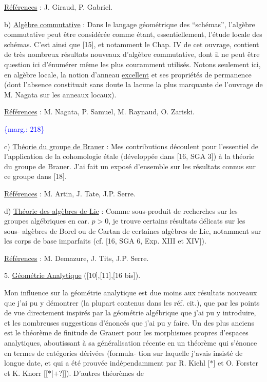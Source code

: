 \documentclass[11pt]{article}
\newcommand{\scanpage}[1]{\par\bigskip\noindent{\small\sffamily[scan #1]}\par}
\newcommand{\mspage}[1]{{\small\sffamily[p.\,#1]}}
\newcommand{\margin}[1]{\textcolor{blue}{\{\textsf{marg.:} #1\}}}
\newcommand{\uline}[1]{\underline{#1}}
\newcommand{\unsure}[1]{[#1?]}
\begin{document}
\uline{Références} : J. Giraud, P. Gabriel.

b) \uline{Algèbre commutative} : Dans le langage géométrique
des ``schémas'', l'algèbre commutative peut être considérée
comme étant, essentiellement, l'étude locale des schémas.
C'est ainsi que [15], et notamment le Chap. IV de cet
ouvrage, contient de très nombreux résultats nouveaux
d'algèbre commutative, dont il ne peut être question
ici d'énumérer même les plus couramment utilisés. Notons
seulement ici, en algèbre locale, la notion d'anneau
\uline{excellent} et ses propriétés de permanence (dont l'absence
constituait sans doute la lacune la plus marquante de
l'ouvrage de M. Nagata sur les anneaux locaux).

\uline{Références} : M. Nagata, P. Samuel, M. Raynaud, O. Zariski.

\margin{218}

\clearpage
\scanpage{119/219}
\mspage{. 6 .}

c) \uline{Théorie du groupe de Brauer} : Mes contributions
découlent pour l'essentiel de l'application de la
cohomologie étale (développée dans [16, SGA 3]) à la
théorie du groupe de Brauer. J'ai fait un exposé
d'ensemble sur les résultats connus sur ce groupe
dans [18].

\uline{Références} : M. Artin, J. Tate, J.P. Serre.

d) \uline{Théorie des algèbres de Lie} : Comme sous-produit
de recherches sur les groupes algébriques en car. $p > 0$,
je trouve certains résultats délicats sur les sous-%
algèbres de Borel ou de Cartan de certaines algèbres
de Lie, notamment sur les corps de base imparfaits
(cf. [16, SGA 6, Exp. XIII et XIV]).

\uline{Références} : M. Demazure, J. Tits, J.P. Serre.

5. \uline{Géométrie Analytique} ([10],[11],[16 bis]).

Mon influence sur la géométrie analytique
est due moins aux résultats nouveaux que j'ai pu y
démontrer (la plupart contenus dans les réf. cit.),
que par les points de vue directement inspirés par la
géométrie algébrique que j'ai pu y introduire, et les
nombreuses suggestions d'énoncés que j'ai pu y faire.
Un des plus anciens est le théorème de finitude de
Grauert pour les morphismes propres d'espaces analytiques,
aboutissant à sa généralisation récente en un théorème
qui s'énonce en termes de catégories dérivées (formula-%
tion sur laquelle j'avais insisté de longue date,
et qui a été prouvée indépendamment par R. Kiehl [$*$]
et O. Forster et K. Knorr [\unsure{$*$|$+$}]). D'autres théorèmes de
\end{document}
